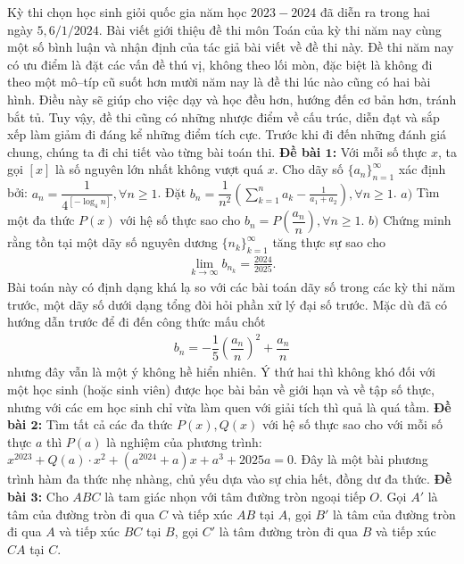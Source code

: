 \begin{multicols}{2}
	Kỳ thi chọn học sinh giỏi quốc gia năm học $2023-2024$ đã diễn ra trong hai ngày $5, 6/1/2024$. Bài viết giới thiệu đề thi môn Toán của kỳ thi năm nay cùng một số bình luận và nhận định của tác giả bài viết về đề thi này.
	\vskip 0.1cm
	Đề thi năm nay có ưu điểm là đặt các vấn đề thú vị, không theo lối mòn, đặc biệt là không đi theo một mô--típ cũ suốt hơn mười năm nay là đề thi lúc nào cũng có hai bài hình. Điều này sẽ giúp cho việc dạy và học đều hơn, hướng đến cơ bản hơn, tránh bắt tủ. Tuy vậy, đề thi cũng có những nhược điểm về cấu trúc, diễn đạt và sắp xếp làm giảm đi đáng kể những điểm tích cực. Trước khi đi đến những đánh giá chung, chúng ta đi chi tiết vào từng bài toán thi.
	\vskip 0.1cm
	\textbf{\color{cackithi}Đề bài $\pmb1$:} Với mỗi số thực $x$, ta gọi $[x]$ là số nguyên lớn nhất không vượt quá $x$.
	\vskip 0.1cm
	Cho dãy số $\{a_n\}_{n=1}^\infty$ xác định bởi: $a_n = \dfrac{1}{4^{[-\log_4 n]}}, \forall n \ge 1$. Đặt $b_n =  \dfrac{1}{n^2}\left( {\sum\limits_{k = 1}^n {{a_k}}  - \frac{1}{{{a_1} + {a_2}}}} \right), \forall n \ge 1$. 
	\vskip 0.1cm
	$a)$ Tìm một đa thức $P(x)$ với hệ số thực sao cho $b_n = P\left(\dfrac{a_n}{n}\right), \forall n \ge 1$.
	\vskip 0.1cm
	\columnbreak
	$b)$ Chứng minh rằng tồn tại một dãy số nguyên dương $\{n_k\}_{k=1}^\infty$ tăng thực sự sao cho
	\begin{align*}
		\mathop {\lim }\limits_{k \to \infty } {b_{{n_k}}} = \frac{{2024}}{{2025}}. 
	\end{align*}
	Bài toán này có định dạng khá lạ so với các bài toán dãy số trong các kỳ thi năm trước, một dãy số dưới dạng tổng đòi hỏi phần xử lý đại số trước. Mặc dù đã có hướng dẫn trước để đi đến công thức mấu chốt
	\begin{align*}
		b_n = - \dfrac{1}{5}\left(\dfrac{a_n}{n}\right)^2 + \dfrac{a_n}{n}
	\end{align*}
	nhưng đây vẫn là một ý không hề hiển nhiên. Ý thứ hai thì không khó đối với một học sinh (hoặc sinh viên) được học bài bản về giới hạn và về tập số thực, nhưng với các em học sinh chỉ vừa làm quen với giải tích thì quả là quá tầm. 
	\vskip 0.1cm
	\textbf{\color{cackithi}Đề bài $\pmb2$:} Tìm tất cả các đa thức $P(x), Q(x)$ với hệ số thực sao cho với mỗi số thực $a$ thì $P(a)$ là nghiệm của phương trình: $x^{2023} + Q(a)\cdot x^2 + (a^{2024} + a)x + a^3 + 2025a = 0$.
	\vskip 0.1cm
	Đây là một bài phương trình hàm đa thức nhẹ nhàng, chủ yếu dựa vào sự chia hết, đồng dư đa thức.
	\vskip 0.1cm
	\textbf{\color{cackithi}Đề bài $\pmb3$:} Cho $ABC$ là tam giác nhọn với tâm đường tròn ngoại tiếp $O$. Gọi $A'$ là tâm của đường tròn đi qua $C$ và tiếp xúc $AB$ tại $A$, gọi $B'$ là tâm của đường tròn đi qua $A$ và tiếp xúc $BC$ tại $B$, gọi $C'$ là tâm đường tròn đi qua $B$ và tiếp xúc $CA$ tại $C$.

\end{multicols}
